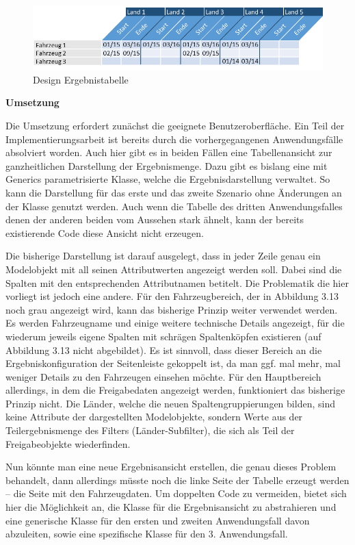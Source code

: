 \begin{figure}[H]
 \centering
 \includegraphics[width=1.0\textwidth]{grafiken/Tabelle_complete.png}
 \caption{Design Ergebnistabelle}
 \label{fig:tabelle3}
\end{figure}

\textbf{Umsetzung}

Die Umsetzung erfordert zunächst die geeignete Benutzeroberfläche. Ein Teil der Implementierungsarbeit ist bereits durch die vorhergegangenen Anwendungsfälle absolviert worden. Auch hier gibt es in beiden Fällen eine Tabellenansicht zur ganzheitlichen Darstellung der Ergebnismenge. Dazu gibt es bislang eine mit Generics parametrisierte Klasse, welche die Ergebnisdarstellung verwaltet. So kann die Darstellung für das erste und das zweite Szenario ohne Änderungen an der Klasse genutzt werden. Auch wenn die Tabelle des dritten Anwendungsfalles denen der anderen beiden vom Aussehen stark ähnelt, kann der bereits existierende Code diese Ansicht nicht erzeugen.

Die bisherige Darstellung ist darauf ausgelegt, dass in jeder Zeile genau ein Modelobjekt mit all seinen Attributwerten angezeigt werden soll. Dabei sind die Spalten mit den entsprechenden Attributnamen betitelt. Die Problematik die hier vorliegt ist jedoch eine andere. Für den Fahrzeugbereich, der in Abbildung 3.13 noch grau angezeigt wird, kann das bisherige Prinzip weiter verwendet werden. Es werden Fahrzeugname und einige weitere technische Details angezeigt, für die wiederum jeweils eigene Spalten mit schrägen Spaltenköpfen existieren (auf Abbildung 3.13 nicht abgebildet). Es ist sinnvoll, dass dieser Bereich an die Ergebniskonfiguration der Seitenleiste gekoppelt ist, da man ggf. mal mehr, mal weniger Details zu den Fahrzeugen einsehen möchte. Für den Hauptbereich allerdings, in dem die Freigabedaten angezeigt werden, funktioniert das bisherige Prinzip nicht. Die Länder, welche die neuen Spaltengruppierungen bilden, sind keine Attribute der dargestellten Modelobjekte, sondern Werte aus der Teilergebnismenge des Filters (Länder-Subfilter), die sich als Teil der Freigabeobjekte wiederfinden.

Nun könnte man eine neue Ergebnisansicht erstellen, die genau dieses Problem behandelt, dann allerdings müsste noch die linke Seite der Tabelle erzeugt werden – die Seite mit den Fahrzeugdaten. Um doppelten Code zu vermeiden, bietet sich hier die Möglichkeit an, die Klasse für die Ergebnisansicht zu abstrahieren und eine generische Klasse für den ersten und zweiten Anwendungsfall davon abzuleiten, sowie eine spezifische Klasse für den 3. Anwendungsfall.

